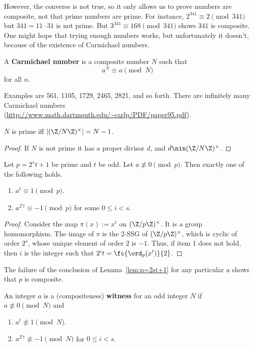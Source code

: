 However, the converse is not true, so it only allows us to prove numbers are composite, not that prime numbers are prime. 
For instance, $2^{341}\equiv 2\pmod{341}$ but $341=11\cdot 31$ is not prime. But $3^{341}\equiv 168\pmod{341}$ shows $341$ is composite. One might hope that trying enough numbers works, but unfortunately it doesn't, because of the existence of Carmichael numbers.
\begin{df}
A \textbf{Carmichael number} is a composite number $N$ such that
\[
a^N\equiv a\pmod N
\]
for all $n$. 
\end{df}
Examples are 561, 1105, 1729, 2465, 2821, and so forth. There are infinitely many Carmichael numbers (\url{http://www.math.dartmouth.edu/\~carlp/PDF/paper95.pdf}). 
\begin{thm}
$N$ is prime iff $|(\Z/N\Z)^{\times}|=N-1$.
\end{thm}
\begin{proof}
If $N$ is not prime it has a proper divisor $d$, and $d\nin (\Z/N\Z)^{\times}$.
\end{proof}
\begin{lem}
Let $p=2^st+1$ be prime and $t$ be odd. Let $a\nequiv 0\pmod p$. Then exactly one of the following holds.
\begin{enumerate}
\item
$a^t\equiv 1\pmod p$.
\item
$a^{2^it}\equiv -1\pmod p$ for some $0\le i<s$.
\end{enumerate}
\end{lem}
\begin{proof}
Consider the map $\pi(x):=x^t$ on $(\Z/p\Z)^{\times}$. It is a group homomorphism. The image of $\pi$ is the 2-SSG of $(\Z/p\Z)^{\times}$, which is cyclic of order $2^s$, whose unique element of order $2$ is $-1$. Thus, if item 1 does not hold, then $i$ is the integer such that $2^it=\fc{\ord_p(x^t)}{2}$.
\end{proof}
The failure of the conclusion of Lemma~\ref{lem:p=2st+1} for any particular $a$ shows that $p$ is composite.
\begin{df}
An integer $a$ is a (compositeness) \textbf{witness} for an odd integer $N$ if $a\nequiv 0\pmod N$ and 
\begin{enumerate}
\item
$a^t\nequiv 1\pmod N$.
\item
$a^{2^it}\nequiv -1\pmod N$ for $0\le i<s$.
\end{enumerate}
\end{df}
